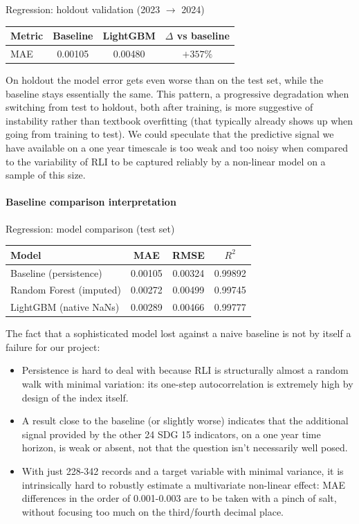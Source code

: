 \begin{center}
Regression: holdout validation (2023 $\rightarrow$ 2024)
\vspace{4pt}

\begin{tabular}{lccc}
\toprule
Metric & Baseline & LightGBM & $\Delta$ vs baseline \\
\midrule
MAE & 0.00105 & 0.00480 & $+357\%$ \\
\bottomrule
\end{tabular}
\end{center}

On holdout the model error gets even worse than on the test set, while the baseline stays essentially the same. This pattern, a progressive degradation when switching from test to holdout, both after training, is more suggestive of instability rather than textbook overfitting (that typically already shows up when going from training to test). We could speculate that the predictive signal we have available on a one year timescale is too weak and too noisy when compared to the variability of RLI to be captured reliably by a non-linear model on a sample of this size.

\paragraph{Baseline comparison interpretation} 
\begin{center}
Regression: model comparison (test set)
\vspace{4pt}

\begin{tabular}{lccc}
\toprule
Model & MAE & RMSE & $R^2$ \\
\midrule
Baseline (persistence)   & 0.00105 & 0.00324 & 0.99892 \\
Random Forest (imputed)  & 0.00272 & 0.00499 & 0.99745 \\
LightGBM (native NaNs)    & 0.00289 & 0.00466 & 0.99777 \\
\bottomrule
\end{tabular}
\end{center}

The fact that a sophisticated model lost against a naive baseline is not by itself a failure for our project:
\begin{itemize}
    \item Persistence is hard to deal with because RLI is structurally almost a random walk with minimal variation: its one-step autocorrelation is extremely high by design of the index itself.
    \item A result close to the baseline (or slightly worse) indicates that the additional signal provided by the other 24 SDG 15 indicators, on a one year time horizon, is weak or absent, not that the question isn't necessarily well posed.
    \item With just 228-342 records and a target variable with minimal variance, it is intrinsically hard to robustly estimate a multivariate non-linear effect: MAE differences in the order of 0.001-0.003 are to be taken with a pinch of salt, without focusing too much on the third/fourth decimal place.
\end{itemize}

